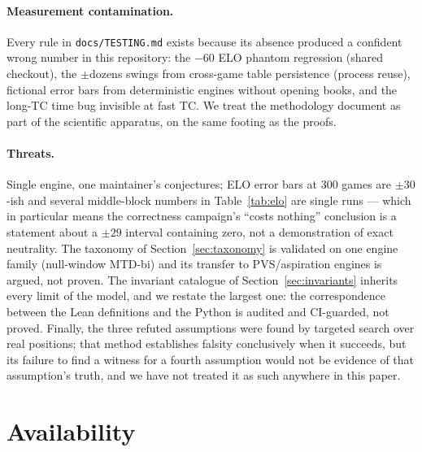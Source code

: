 \documentclass[11pt]{article}
\theoremstyle{plain}
\theoremstyle{definition}
\theoremstyle{remark}
\begin{document}
\paragraph{Measurement contamination.}
Every rule in \texttt{docs/TESTING.md} exists because its absence
produced a confident wrong number in this repository: the $-60$ ELO
phantom regression (shared checkout), the $\pm$dozens swings from
cross-game table persistence (process reuse), fictional error bars from
deterministic engines without opening books, and the long-TC time bug
invisible at fast TC.  We treat the methodology document as part of the
scientific apparatus, on the same footing as the proofs.

\paragraph{Threats.}
Single engine, one maintainer's conjectures; ELO error bars at 300
games are $\pm 30$-ish and several middle-block numbers in
Table~\ref{tab:elo} are single runs --- which in particular means the
correctness campaign's ``costs nothing'' conclusion is a statement
about a $\pm 29$ interval containing zero, not a demonstration of
exact neutrality.  The taxonomy of Section~\ref{sec:taxonomy} is
validated on one engine family (null-window MTD-bi) and its transfer to
PVS/aspiration engines is argued, not proven.  The invariant catalogue
of Section~\ref{sec:invariants} inherits every limit of the model, and
we restate the largest one: the correspondence between the Lean
definitions and the Python is audited and CI-guarded, not proved.
Finally, the three refuted assumptions were found by targeted search
over real positions; that method establishes falsity conclusively when
it succeeds, but its failure to find a witness for a fourth assumption
would not be evidence of that assumption's truth, and we have not
treated it as such anywhere in this paper.

\section{Availability}
\label{sec:availability}
\end{document}
